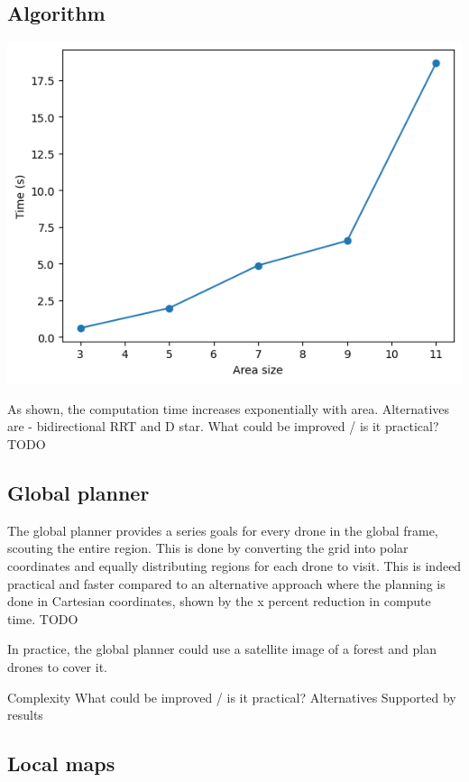 \subsection{Algorithm}

\includegraphics[scale=0.5]{images/time_area.png}

As shown, the computation time increases exponentially with area.
Alternatives are - bidirectional RRT and D star.
What could be improved / is it practical? TODO
 
\subsection{Global planner}

The global planner provides a series goals for every drone in the global frame, scouting the entire region. This is done by converting the grid into polar coordinates and equally distributing regions for each drone to visit. This is indeed practical and faster compared to an alternative approach where the planning is done in Cartesian coordinates, shown by the x percent reduction in compute time. TODO

In practice, the global planner could use a satellite image of a forest and plan drones to cover it. 

Complexity
What could be improved / is it practical?
Alternatives
Supported by results

\subsection{Local maps}

